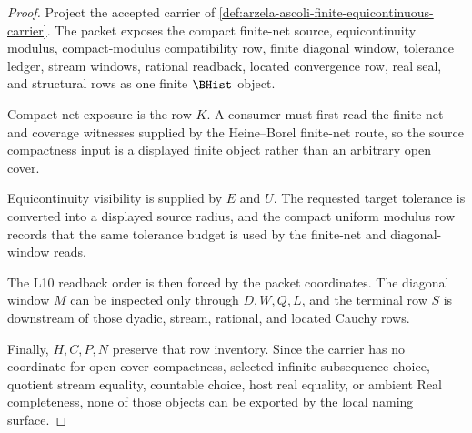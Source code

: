\begin{proof}
Project the accepted carrier of \autoref{def:arzela-ascoli-finite-equicontinuous-carrier}. The packet exposes the compact finite-net source, equicontinuity modulus, compact-modulus compatibility row, finite diagonal window, tolerance ledger, stream windows, rational readback, located convergence row, real seal, and structural rows as one finite $\BHist$ object.

Compact-net exposure is the row $K$. A consumer must first read the finite net and coverage witnesses supplied by the Heine--Borel finite-net route, so the source compactness input is a displayed finite object rather than an arbitrary open cover.

Equicontinuity visibility is supplied by $E$ and $U$. The requested target tolerance is converted into a displayed source radius, and the compact uniform modulus row records that the same tolerance budget is used by the finite-net and diagonal-window reads.

The L10 readback order is then forced by the packet coordinates. The diagonal window $M$ can be inspected only through $D,W,Q,L$, and the terminal row $S$ is downstream of those dyadic, stream, rational, and located Cauchy rows.

Finally, $H,C,P,N$ preserve that row inventory. Since the carrier has no coordinate for open-cover compactness, selected infinite subsequence choice, quotient stream equality, countable choice, host real equality, or ambient Real completeness, none of those objects can be exported by the local naming surface.
\end{proof}



